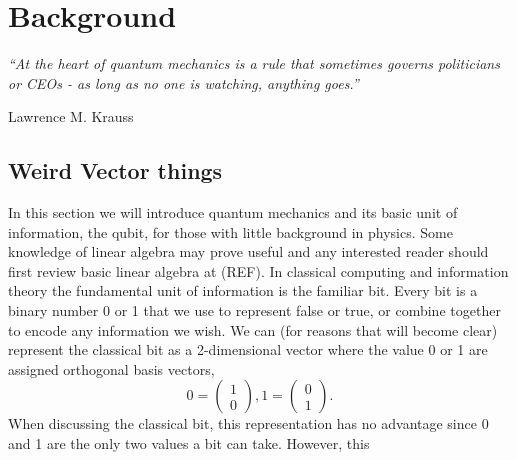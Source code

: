 \chapter{Background}
\label{chpt:background}

\epigraph{\textit{“At the heart of quantum mechanics is a rule that sometimes governs politicians or CEOs - as long as no one is watching, anything goes.” }}{Lawrence M. Krauss
}

\section{Weird Vector things}\label{TheBasics}

In this section we will introduce quantum mechanics and its basic unit of information, the qubit, for those with little background in physics. Some knowledge of linear algebra may prove useful and any interested reader should first review basic linear algebra at (REF).
In classical computing and information theory the fundamental unit of information is the familiar bit. Every bit is a binary number 0 or 1 that we use to represent false or true, or combine together to encode any information we wish. We can (for reasons that will become clear) represent 
the classical bit as a 2-dimensional vector where the value 0 or 1 are assigned orthogonal basis vectors,
\begin{equation}
0 = \begin{pmatrix} 1\\ 0 \end{pmatrix},
1 = \begin{pmatrix} 0\\ 1 \end{pmatrix}.
\end{equation}
When discussing the classical bit, this representation has no advantage since 0 and 1 are the only two values a bit can take. However, this 

